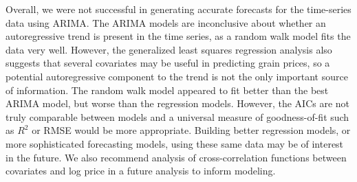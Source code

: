 \documentclass[11pt]{article}
\begin{document}
Overall, we were not successful in generating accurate forecasts for the
time-series data using ARIMA. The ARIMA models are inconclusive about whether
an autoregressive trend is present in the time series, as a random walk model
fits the data very well. However, the generalized least squares regression
analysis also suggests that several covariates may be useful in predicting
grain prices, so a potential autoregressive component to the trend is not the
only important source of information. The random walk model appeared to fit
better than the best ARIMA model, but worse than the regression models.
However, the AICs are not truly comparable between models and a universal
measure of goodness-of-fit such as $R^2$ or RMSE would be more
appropriate. Building better regression models, or
more sophisticated forecasting models, using these same data may be of interest
in the future. We also recommend analysis of cross-correlation functions
between covariates and log price in a future analysis to inform modeling.

\newpage


\end{document}
